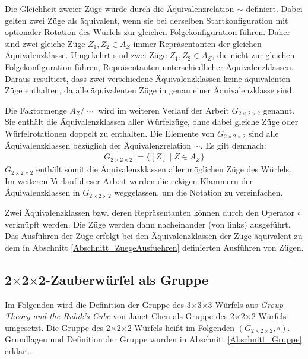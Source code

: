 \documentclass[12pt,a4paper, usenames, dvipsnames]{article}
\theoremstyle{mystyle}
\theoremstyle{definition}
\newcommand{\Gtwo}{\ensuremath{G_{2\times 2\times 2}}}
\newcommand{\Ttwo}{2$\times$2$\times$2-}
\newcommand{\Tthree}{3$\times$3$\times$3-}
\begin{document}
Die Gleichheit zweier Züge wurde durch die Äquivalenzrelation $\sim$ definiert. Dabei gelten zwei Züge als äquivalent, wenn sie bei derselben Startkonfiguration mit optionaler Rotation des Würfels zur gleichen Folgekonfiguration führen. Daher sind zwei gleiche Züge $Z_1, Z_2 \in A_Z$ immer Repräsentanten der gleichen Äquivalenzklasse. Umgekehrt sind zwei Züge $Z_1, Z_2 \in A_Z$, die nicht zur gleichen Folgekonfiguration führen, Repräsentanten unterschiedlicher Äquivalenzklassen.
Daraus resultiert, dass zwei verschiedene Äquivalenzklassen keine äquivalenten Züge enthalten, da alle äquivalenten Züge in genau einer Äquivalenzklasse sind. 

Die Faktormenge $A_Z / \sim$ wird im weiteren Verlauf der Arbeit $\Gtwo$ genannt. Sie enthält die Äquivalenzklassen aller Würfelzüge, ohne dabei gleiche Züge oder Würfelrotationen doppelt zu enthalten.
Die Elemente von $\Gtwo$ sind alle Äquivalenzklassen bezüglich der Äquivalenzrelation $\sim$. Es gilt demnach:
\begin{align*}
\Gtwo := \{[Z] \mid Z \in A_Z \}
\end{align*}
$\Gtwo$ enthält somit die Äquivalenzklassen aller möglichen Züge des Würfels. 
Im weiteren Verlauf dieser Arbeit werden die eckigen Klammern der Äquivalenzklassen in $\Gtwo$ weggelassen, um die Notation zu vereinfachen.

Zwei Äquivalenzklassen bzw. deren Repräsentanten können durch den Operator $\circ$ verknüpft werden. Die Züge werden dann nacheinander (von links) ausgeführt. Das Ausführen der Züge erfolgt bei den Äquivalenzklassen der Züge äquivalent zu dem in Abschnitt \ref{Abschnitt_ZuegeAusfuehren} definierten Ausführen von Zügen.

%
%
%
%
%
%
%
%
%
%
%
%
%
%
%
%
%
%
%

\subsection{\Ttwo Zauberwürfel als Gruppe} 
 \label{Abschnitt_WürfelAlsGruppe}

Im Folgenden wird die Definition der Gruppe des \Tthree Würfels aus \textit{Group Theory and the Rubik's Cube}  von Janet Chen \cite{JC} als Gruppe des \Ttwo Würfels umgesetzt. Die Gruppe des \Ttwo Würfels heißt im Folgenden $(\Gtwo, \circ)$. 
Grundlagen und Definition der Gruppe wurden in Abschnitt \ref{Abschnitt_Gruppe} erklärt.
\end{document}
